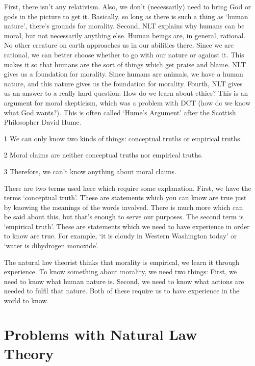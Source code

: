 First, there isn't any relativism. Also, we don’t (necessarily) need to bring God or gods in the picture to get it. Basically, so long as there is such a thing as ‘human nature’, there’s grounds for morality. Second, NLT explains why humans can be moral, but not necessarily anything else. Human beings are, in general, rational. No other creature on earth approaches us in our abilities there. Since we are rational, we can better choose whether to go with our nature or against it. This makes it so that humans are the sort of things which get praise and blame. NLT gives us a foundation for morality. Since humans are animals, we have a human nature, and this nature gives us the foundation for morality. Fourth, NLT gives us an answer to a really hard question: How do we learn about ethics? This is an argument for moral skepticism, which was a problem with DCT (how do we know what God wants?). This is often called ‘Hume’s Argument’ after the Scottish Philosopher David Hume.
\begin{earg}
    \item[1] We can only know two kinds of things: conceptual truths or empirical truths.
    \item[2] Moral claims are neither conceptual truths nor empirical truths.
    \item[3] Therefore, we can’t know anything about moral claims.
\end{earg}

There are two terms used here which require some explanation. First, we have the terms `conceptual truth'. These are statements which you can know are true just by knowing the meanings of the words involved. There is much more which can be said about this, but that's enough to serve our purposes. The second term is `empirical truth'. These are statements which we need to have experience in order to know are true. For example, `it is cloudy in Western Washington today' or `water is dihydrogen monoxide'. 

The natural law theorist thinks that morality is empirical, we learn it through experience. To know something about morality, we need two things: First, we need to know what human nature is. Second, we need to know what actions are needed to fulfil that nature. Both of these require us to have experience in the world to know.

\section{Problems with Natural Law Theory}

